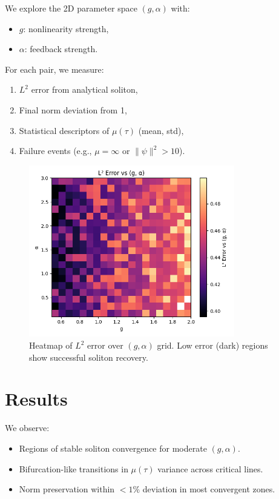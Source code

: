 \documentclass[11pt]{article}
\begin{document}
We explore the 2D parameter space $(g, \alpha)$ with:
\begin{itemize}
  \item $g$: nonlinearity strength,
  \item $\alpha$: feedback strength.
\end{itemize}
For each pair, we measure:
\begin{enumerate}
  \item $L^2$ error from analytical soliton,
  \item Final norm deviation from 1,
  \item Statistical descriptors of $\mu(\tau)$ (mean, std),
  \item Failure events (e.g., $\mu = \infty$ or $\|\psi\|^2 > 10$).
\end{enumerate}

\begin{figure}[h]
\centering
\includegraphics[width=0.8\textwidth]{Figure4.png}
\caption{Heatmap of $L^2$ error over $(g, \alpha)$ grid. Low error (dark) regions show successful soliton recovery.}
\end{figure}

\section{Results}

We observe:
\begin{itemize}
  \item Regions of stable soliton convergence for moderate $(g, \alpha)$.
  \item Bifurcation-like transitions in $\mu(\tau)$ variance across critical lines.
  \item Norm preservation within $<1\%$ deviation in most convergent zones.
\end{itemize}
\end{document}
